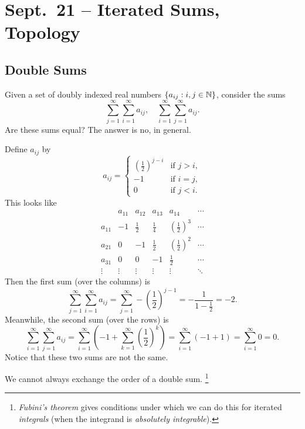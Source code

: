 \chapter{Sept.~21 -- Iterated Sums, Topology}

\section{Double Sums}
Given a set of doubly indexed real numbers
$\{a_{ij} : i, j \in \mathbb{N}\}$, consider the
sums
\[
  \sum_{j = 1}^\infty \sum_{i = 1}^\infty a_{ij}, \quad
  \sum_{i = 1}^\infty \sum_{j = 1}^\infty a_{ij}.
\]
Are these sums equal? The answer is no, in general.

\begin{example}
  Define $a_{ij}$ by
  \[
    a_{ij} = \begin{cases}
      \left(\frac{1}{2}\right)^{j - i} & \text{if $j > i$}, \\
      -1 & \text{if $i = j$}, \\
      0 & \text{if $j < i$}.
    \end{cases}
  \]
  This looks like
  \[
    \begin{array}{c|ccccc}
      & a_{11} & a_{12} & a_{13} & a_{14} & \cdots \\
      \hline
      a_{11} & -1 & \frac{1}{2} & \frac{1}{4} & \left(\frac{1}{2}\right)^3 & \cdots \\
      a_{21} & 0 & -1 & \frac{1}{2} & \left(\frac{1}{2}\right)^2 & \cdots \\
      a_{31} & 0 & 0 & -1 & \frac{1}{2} & \cdots \\
      \vdots & \vdots & \vdots & \vdots & \vdots & \ddots
    \end{array}
  \]
  Then the first sum (over the columns) is
  \[
    \sum_{j = 1}^\infty \sum_{i = 1}^\infty a_{ij}
    = \sum_{j = 1}^\infty -\left(\frac{1}{2}\right)^{j - 1}
    = -\frac{1}{1 - \frac{1}{2}} = -2
  .\]
  Meanwhile, the second sum (over the rows) is
  \[
    \sum_{i = 1}^\infty \sum_{j = 1}^\infty a_{ij}
    = \sum_{i = 1}^\infty \left(-1 + \sum_{k = 1}^\infty \left(\frac{1}{2}\right)^{k}\right)
    = \sum_{i = 1}^\infty \left(-1 + 1\right)
    = \sum_{i = 1}^\infty 0 = 0
  .\]
  Notice that these two sums are not the same.
\end{example}

\begin{remark}
  We cannot always exchange the order of a double
  sum.
  \footnote{\textit{Fubini's theorem} gives conditions under which we can do this for iterated \textit{integrals} (when the integrand is \textit{absolutely integrable}).}
\end{remark}

